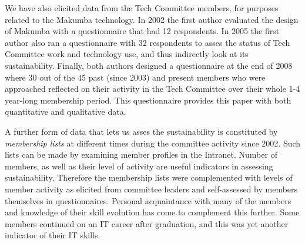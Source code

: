 \documentclass{llncs}
\begin{document}
We have also elicited data from the Tech Committee members, for purposes related to the Makumba technology. In 2002 the first author evaluated the design of Makumba with a questionnaire that had 12 respondents. In 2005 the first author also ran a questionnaire with 32 respondents to asses the status of Tech Committee work and technology use, and thus indirectly look at its sustainability. Finally, both authors designed a questionnaire at the end of 2008 where 30 out of the 45 past (since 2003) and present members who were approached reflected on their activity in the Tech Committee over their whole 1-4 year-long membership period. This questionnaire provides this paper with both quantitative and qualitative data. 

A further form of data that lets us asses the sustainability is constituted by  {\it membership lists} at different times during the committee activity since 2002. Such lists can be made by examining member profiles in the Intranet. Number of members, as well as their level of activity are useful indicators in assessing sustainability. Therefore the membership lists were complemented with levels of member activity as elicited from committee leaders and self-assessed by members themselves in questionnaires. Personal acquaintance with many of the members and knowledge of their skill evolution has come to complement this further. Some members continued on an IT career after graduation, and this was yet another indicator of their IT skills. 
\end{document}
